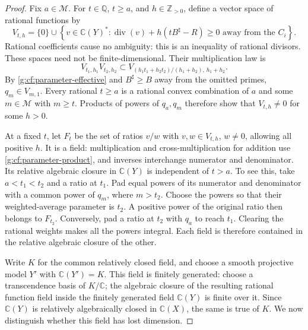 \begin{proof}
Fix \(a\in\mathcal M\).  For \(t\in\mathbb Q\), \(t\geq a\),
and \(h\in\mathbb Z_{>0}\), define a vector space of rational
functions by
\begin{equation}\label{g:cf:parameter-spaces}
 V_{t,h}=\{0\}\cup
 \left\{v\in\mathbb C(Y)^*:
 \operatorname{div}(v)+h(tB^\sharp-R)\geq0
 \text{ away from the }C_i\right\}.
\end{equation}
Rational coefficients cause no ambiguity: this is an inequality
of rational divisors.  These spaces need not be finite-dimensional.
Their multiplication law is
\begin{equation}\label{g:cf:parameter-product}
 V_{t_1,h_1}V_{t_2,h_2}
 \subset
 V_{(h_1t_1+h_2t_2)/(h_1+h_2),\,h_1+h_2}.
\end{equation}
By \eqref{g:cf:parameter-effective} and
\(B^\sharp\geq B\) away from the omitted primes,
\(q_m\in V_{m,1}\).  Every rational \(t\geq a\) is a rational
convex combination of \(a\) and some \(m\in\mathcal M\) with
\(m\geq t\).  Products of powers of \(q_a,q_m\) therefore show
that \(V_{t,h}\ne0\) for some \(h>0\).

At a fixed \(t\), let \(F_t\) be the set of ratios \(v/w\) with
\(v,w\in V_{t,h}\), \(w\ne0\), allowing all positive \(h\).
It is a field: multiplication and cross-multiplication for addition
use \eqref{g:cf:parameter-product}, and inverses interchange
numerator and denominator.  Its relative algebraic closure in
\(\mathbb C(Y)\) is independent of \(t>a\).  To see this, take
\(a<t_1<t_2\) and a ratio at \(t_1\).  Pad equal powers of its
numerator and denominator with a common power of \(q_m\), where
\(m>t_2\).  Choose the powers so that their weighted-average
parameter is \(t_2\).  A positive power of the original ratio
then belongs to \(F_{t_2}\).  Conversely, pad a ratio at \(t_2\)
with \(q_a\) to reach \(t_1\).  Clearing the rational weights
makes all the powers integral.  Each field is therefore contained
in the relative algebraic closure of the other.

Write \(K\) for the common relatively closed field, and choose a
smooth projective model \(Y'\) with \(\mathbb C(Y')=K\).  This
field is finitely generated: choose a transcendence basis of
\(K/\mathbb C\); the algebraic closure of the resulting rational
function field inside the finitely generated field \(\mathbb C(Y)\)
is finite over it.  Since \(\mathbb C(Y)\) is relatively
algebraically closed in \(\mathbb C(X)\), the same is true of
\(K\).  We now distinguish whether this field has lost dimension.


\end{proof}
